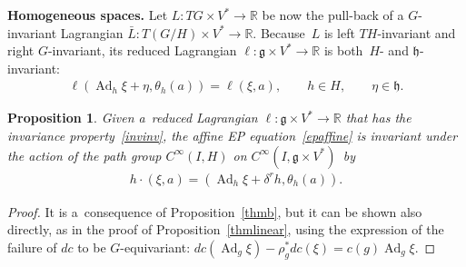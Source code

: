 \documentclass[10pt,a4paper]{amsart}
\numberwithin{equation}{section}
\newtheorem{Proposition}[Theorem]{Proposition}
{ \theoremstyle{definition}
\newtheorem{Example}[Theorem]{Example}
\newtheorem{Remark}[Theorem]{Remark} }
\begin{document}
{\bf Homogeneous spaces.} Let $L:TG\times V^*\to\mathbb R$ be now the pull-back of a $G$-invariant Lagrangian $\bar
L:T(G/H)\times V^*\to\mathbb R$.
Because~$L$ is left $TH$-invariant and right $G$-invariant, its reduced Lagrangian $\ell:\mathfrak g\times V^*\to\mathbb
R$ is both~$H$- and $\mathfrak h$-invariant:
\begin{gather}
\label{invinv}
\ell(\operatorname{Ad}_h\xi+\eta,\theta_{h}(a))=\ell(\xi,a),
\qquad
h\in H,
\qquad
\eta\in\mathfrak h.
\end{gather}

\begin{Proposition}
Given a~reduced Lagrangian $\ell:\mathfrak g\times V^*\to\mathbb R$ that has the invariance pro\-per\-ty~\eqref{invinv}, the
affine EP equation~\eqref{epaffine} is invariant under the action of the path group $C^{\infty}(I,H)$ on
$C^{\infty}(I,\mathfrak g\times V^*)$~by
\begin{gather}
\label{affact}
h\cdot (\xi,a)=(\operatorname{Ad}_h\xi+\delta^rh,\theta_{h}(a)).
\end{gather}
\end{Proposition}

\begin{proof}
It is a~consequence of Proposition~\ref{thmb}, but it can be shown also directly, as in the proof of
Proposition~\ref{thmlinear}, using the expression of the failure of $dc$ to be $G$-equivariant:
$dc(\operatorname{Ad}_g\xi)-\rho^*_gdc(\xi)=c(g)\operatorname{Ad}_g\xi$.
\end{proof}
\end{document}
